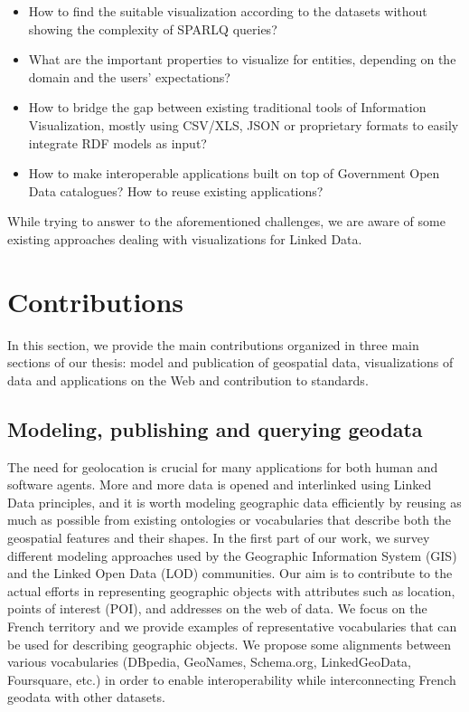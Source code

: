 \begin{itemize}
\item  How to find the suitable visualization according to the datasets without showing the complexity of SPARLQ queries?
 \item  What are the important properties to visualize for entities, depending on the domain and the users' expectations?
 \item  How to bridge the gap between existing traditional tools of Information Visualization, mostly using CSV/XLS, JSON or proprietary formats to easily integrate RDF models as input?
 \item How to make interoperable applications built on top of Government Open Data catalogues? How to reuse existing applications?
\end{itemize}
 
 While trying to answer to the aforementioned challenges, we are aware of some existing approaches dealing with visualizations for Linked Data. 


\section{Contributions}
\label{sec:contributions}
In this section, we provide the main contributions organized in three main sections of our thesis: model and publication of geospatial data, visualizations of data and applications on the Web and contribution to standards. 

\subsection{Modeling, publishing and querying geodata}
The need for geolocation is crucial for many applications for both human and software agents. More and more data is opened and interlinked using Linked Data principles, and it is worth modeling geographic data efficiently by reusing as much as possible from existing ontologies or vocabularies that describe both the geospatial features and their shapes. In the first part of our work, we survey different modeling approaches used by the Geographic Information System (GIS) and the Linked Open Data (LOD) communities. Our aim is to contribute to the actual efforts in representing geographic objects with attributes such as location, points of interest (POI), and addresses on the web of data. We focus on the French territory and we provide examples of representative vocabularies that can be used for describing geographic objects. We propose some alignments between various vocabularies (DBpedia, GeoNames, Schema.org, LinkedGeoData, Foursquare, etc.) in order to enable interoperability while interconnecting French geodata with other datasets. 

